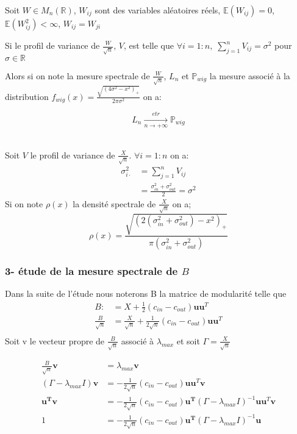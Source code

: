 \begin{theorem}\label{th:1}
Soit $W \in M_{n}(\mathbb{R})$, $W_{ij}$ sont des variables aléatoires réels, $\mathbb{E}(W_{ij}) = 0$, $\mathbb{E}(W_{ij}^2) < \infty$, $W_{ij} = W_{ji}$

Si le profil de variance de $\frac{W}{\sqrt{n}}$, $V$, est telle que $\forall i = 1:n , \; \sum_{j=1}^{n}V_{ij} = \sigma^2$ pour $\sigma \in \mathbb{R}$

Alors si on note la mesure spectrale de $\frac{W}{\sqrt{n}}$, $L_{n}$  et $\mathbb{P}_{wig}$ la mesure associé à la distribution $f_{wig}(x)= \frac{\sqrt{(4\sigma^2 - x^2)_+}}{2\pi\sigma^2}$ on a:

\begin{equation}
	L_n\xrightarrow[n \to +\infty]{etr} \mathbb{P}_{wig}\nonumber
\end{equation}\\
\end{theorem}

Soit $V$ le profil de variance de $\frac{X}{\sqrt{n}}$. $\forall i = 1:n$ on a: 
\begin{align*} 
\sigma_{i \cdot}^2 &= \sum_{j=1}^{n}V_{ij}  \\
 		&= \boxed{\frac{\sigma_{in}^2 + \sigma_{out}^2}{2} = \sigma^2}
\end{align*}
Si on note $\rho(x)$ la densité spectrale de $\frac{X}{\sqrt{n}}$ on a;
\begin{equation}
	\rho(x) = \frac{\sqrt{(2(\sigma_{in}^2 + \sigma_{out}^2) - x^2)_+}}{\pi(\sigma_{in}^2 + \sigma_{out}^2)}
\end{equation}

\subsubsection*{3- étude de la mesure spectrale de $B$}
Dans la suite de l'étude nous noterons B la matrice de modularité telle que 
\begin{align*} 
B :&= X + \frac{1}{2}(c_{in} - c_{out})\mathbf{uu}^T \\
\frac{B}{\sqrt{n}} &= \frac{X}{\sqrt{n}} + \frac{1}{2\sqrt{n}}(c_{in} - c_{out})\mathbf{uu}^T\\
\end{align*}
Soit v le vecteur propre de $\frac{B}{\sqrt{n}}$ associé à $\lambda_{max}$ et soit $\Gamma = \frac{X}{\sqrt{n}}$

\begin{align} 
\frac{B}{\sqrt{n}}\mathbf{v} &= \lambda_{max}\mathbf{v} \nonumber\\
(\Gamma - \lambda_{max}I)\mathbf{v} &= -\frac{1}{2\sqrt{n}}(c_{in} - c_{out})\mathbf{uu}^T \mathbf{v} \nonumber\\
 \mathbf{u^Tv} &= -\frac{1}{2\sqrt{n}}(c_{in} - c_{out})\mathbf{u^T}(\Gamma - \lambda_{max}I)^{-1}\mathbf{uu}^T \mathbf{v} \nonumber\\
 1 &= -\frac{1}{2\sqrt{n}}(c_{in} - c_{out})\mathbf{u^T}(\Gamma - \lambda_{max}I)^{-1}\mathbf{u} \label{eq:3}
\end{align}

